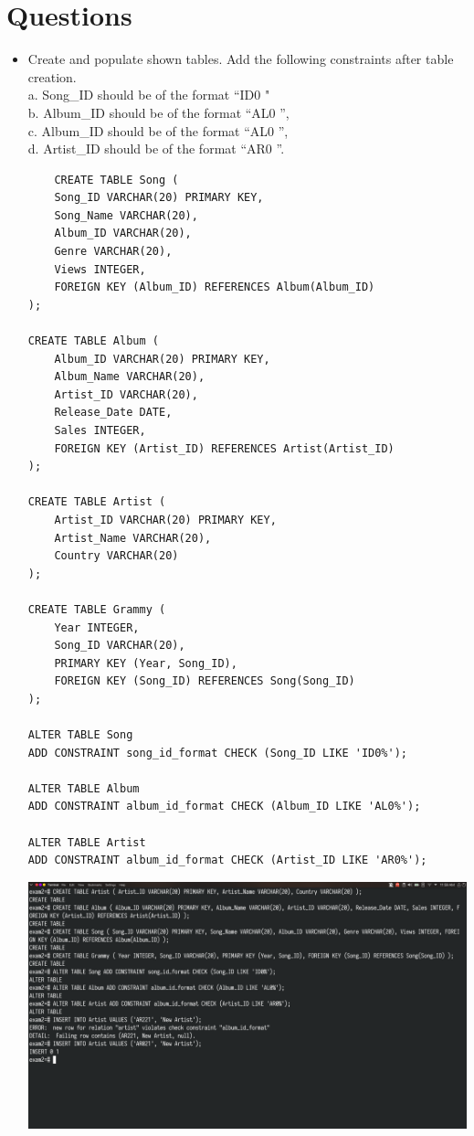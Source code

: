 \documentclass[13pt,oneside]{book}
\begin{document}
\section*{Questions}
\begin{itemize}
\item 
Create and populate shown tables. Add the following constraints after table creation. \\
a. Song\_ID should be of the format “ID0 " \\
b. Album\_ID should be of the format “AL0 ”, \\
c. Album\_ID should be of the format “AL0 ”, \\
d. Artist\_ID should be of the format “AR0 ”. \\
\begin{verbatim}
	CREATE TABLE Song (
	Song_ID VARCHAR(20) PRIMARY KEY,
	Song_Name VARCHAR(20),
	Album_ID VARCHAR(20),
	Genre VARCHAR(20),
	Views INTEGER,
	FOREIGN KEY (Album_ID) REFERENCES Album(Album_ID)
);

CREATE TABLE Album (
	Album_ID VARCHAR(20) PRIMARY KEY,
	Album_Name VARCHAR(20),
	Artist_ID VARCHAR(20),
	Release_Date DATE,
	Sales INTEGER,
	FOREIGN KEY (Artist_ID) REFERENCES Artist(Artist_ID)
);

CREATE TABLE Artist (
	Artist_ID VARCHAR(20) PRIMARY KEY,
	Artist_Name VARCHAR(20),
	Country VARCHAR(20)
);

CREATE TABLE Grammy (
	Year INTEGER,
	Song_ID VARCHAR(20),
	PRIMARY KEY (Year, Song_ID),
	FOREIGN KEY (Song_ID) REFERENCES Song(Song_ID)
);

ALTER TABLE Song
ADD CONSTRAINT song_id_format CHECK (Song_ID LIKE 'ID0%');

ALTER TABLE Album
ADD CONSTRAINT album_id_format CHECK (Album_ID LIKE 'AL0%');

ALTER TABLE Artist
ADD CONSTRAINT album_id_format CHECK (Artist_ID LIKE 'AR0%');
\end{verbatim}
\includegraphics[width=\textwidth]{img/q/1_constraintcheck.png}


\end{itemize}
\end{document}
